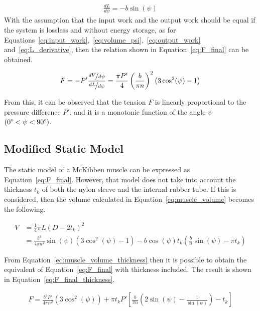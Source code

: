 \begin{align}
\frac{dL}{d \psi} = -b \sin{(\psi)} \label{eq:L_derivative}
\end{align}
With the assumption that the input work and the output work should be equal
if the system is lossless and without energy storage, as for
Equations~\ref{eq:input_work},~\ref{eq:volume_psi},~\ref{eq:output_work} and~\ref{eq:L_derivative},
then the relation shown in Equation~\ref{eq:F_final} can be obtained.

\begin{align}
F = -P'\frac{\nicefrac{dV}{d \psi}}{\nicefrac{dL}{d \psi}} = \frac{\pi P'}{4}\left(\frac{b}{\pi n}\right)^2 \left(3 \cos^2(\psi) - 1 \right)\label{eq:F_final}
\end{align}

From this, it can be observed that the tension $F$ is linearly proportional to the
pressure difference $P'$, and it is a monotonic function of the angle $\psi$ $(0\degree < \psi < 90\degree)$.

\subsection{Modified Static Model}

The static model of a McKibben muscle can be expressed as Equation~\ref{eq:F_final}.
However, that model does not take into account the thickness $t_k$ of both the nylon
sleeve and the internal rubber tube. If this is considered, then the volume calculated
in Equation~\ref{eq:muscle_volume} becomes the following.

\begin{align}
V &= \frac{1}{4}\pi L \left(D - 2 t_k \right)^2 \nonumber \\
&= \frac{b^3}{4 \pi n^2}\sin{(\psi)}\left(3 \cos^2(\psi) - 1 \right)-b \cos{(\psi)}t_k
\left(\frac{b}{n}\sin{(\psi)}-\pi t_k\right) \label{eq:muscle_volume_thickness}
\end{align}

From Equation~\ref{eq:muscle_volume_thickness} then it is possible to obtain
the equivalent of Equation~\ref{eq:F_final} with thickness included.
The result is shown in Equation~\ref{eq:F_final_thickness}.

\begin{align}
	F = \frac{b^2 P'}{4 \pi n^2}\left(3 \cos^2{(\psi)} \right)+\pi t_k P' 
	\left [\frac{b}{\pi n}\left( 2 \sin (\psi) - \frac{1}{\sin (\psi)} \right) - t_k \right]
	\label{eq:F_final_thickness}
\end{align}

